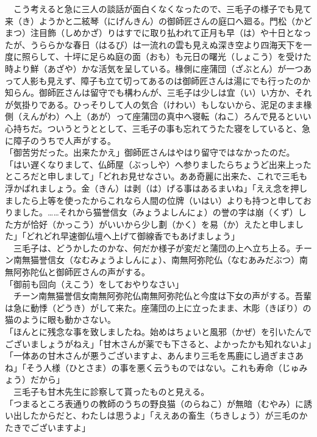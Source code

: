 　こう考えると急に三人の談話が面白くなくなったので、三毛子の様子でも見て来（き）ようかと二絃琴（にげんきん）の御師匠さんの庭口へ廻る。門松（かどまつ）注目飾（しめかざ）りはすでに取り払われて正月も早（は）や十日となったが、うららかな春日（はるび）は一流れの雲も見えぬ深き空より四海天下を一度に照らして、十坪に足らぬ庭の面（おも）も元日の曙光（しょこう）を受けた時より鮮（あざや）かな活気を呈している。椽側に座蒲団（ざぶとん）が一つあって人影も見えず、障子も立て切ってあるのは御師匠さんは湯にでも行ったのか知らん。御師匠さんは留守でも構わんが、三毛子は少しは宜（い）い方か、それが気掛りである。ひっそりして人の気合（けわい）もしないから、泥足のまま椽側（えんがわ）へ上（あが）って座蒲団の真中へ寝転（ねこ）ろんで見るといい心持ちだ。ついうとうととして、三毛子の事も忘れてうたた寝をしていると、急に障子のうちで人声がする。\\
「御苦労だった。出来たかえ」御師匠さんはやはり留守ではなかったのだ。\\
「はい遅くなりまして、仏師屋（ぶっしや）へ参りましたらちょうど出来上ったところだと申しまして」「どれお見せなさい。ああ奇麗に出来た、これで三毛も浮かばれましょう。金（きん）は剥（は）げる事はあるまいね」「ええ念を押しましたら上等を使ったからこれなら人間の位牌（いはい）よりも持つと申しておりました。\ldots{}\ldots{}それから猫誉信女（みょうよしんにょ）の誉の字は崩（くず）した方が恰好（かっこう）がいいから少し劃（かく）を易（か）えたと申しました」「どれどれ早速御仏壇へ上げて御線香でもあげましょう」\\
　三毛子は、どうかしたのかな、何だか様子が変だと蒲団の上へ立ち上る。チーン南無猫誉信女（なむみょうよしんにょ）、南無阿弥陀仏（なむあみだぶつ）南無阿弥陀仏と御師匠さんの声がする。\\
「御前も回向（えこう）をしておやりなさい」\\
　チーン南無猫誉信女南無阿弥陀仏南無阿弥陀仏と今度は下女の声がする。吾輩は急に動悸（どうき）がして来た。座蒲団の上に立ったまま、木彫（きぼり）の猫のように眼も動かさない。\\
「ほんとに残念な事を致しましたね。始めはちょいと風邪（かぜ）を引いたんでございましょうがねえ」「甘木さんが薬でも下さると、よかったかも知れないよ」「一体あの甘木さんが悪うございますよ、あんまり三毛を馬鹿にし過ぎまさあね」「そう人様（ひとさま）の事を悪く云うものではない。これも寿命（じゅみょう）だから」\\
　三毛子も甘木先生に診察して貰ったものと見える。\\
「つまるところ表通りの教師のうちの野良猫（のらねこ）が無暗（むやみ）に誘い出したからだと、わたしは思うよ」「ええあの畜生（ちきしょう）が三毛のかたきでございますよ」\\
